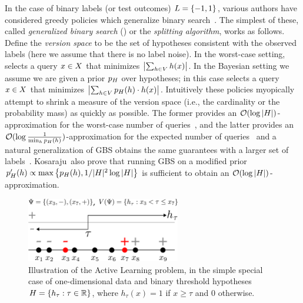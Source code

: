 In the case of binary labels (or test outcomes) $L = \left\{-1, 1\right\}$, various authors have considered greedy
policies which generalize binary
search~\citep{garey74,loveland85,arkin93,kosaraju99,dasgupta04,guillory09,nowak09}.  
The simplest of these, called \emph{generalized binary search} (\gbs) or the
\emph{splitting algorithm}, works as follows.
Define the \emph{version
  space} \vs to be the set of hypotheses consistent with the observed
labels (here we assume that there is no label noise).
In the worst-case setting, \gbs selects a query $x \in
X$ that minimizes $\left| \sum_{h \in V} h(x) \right|$. 
In the Bayesian setting we assume we are given a prior $p_{H}$ over
hypotheses; in this case \gbs selects a query $x \in
X$ that minimizes $\left| \sum_{h \in V} p_{H}(h) \cdot h(x) \right|$.  Intuitively
these policies myopically attempt to shrink a measure of the version space (i.e., 
the cardinality or the probability mass) as quickly as
possible.
The former provides an ${\mathcal{O}}(\log |H|)$-approximation for the
worst-case number of queries~\citep{arkin93}, and the latter provides an 
 ${\mathcal{O}}(\log \frac{1}{\min_{h} p_{H}(h)})$-approximation for the 
expected number of queries~\citep{kosaraju99,dasgupta04} and a natural
generalization of GBS obtains the same guarantees with a larger set of
labels~\citep{guillory09}. 
%
Kosaraju~\etal also prove that running GBS on a modified prior 
$p_{H}'(h) \propto \max\left\{p_{H}(h), 1/|H|^{2}\log
  |H|\right\}$ is sufficient to obtain an  ${\mathcal{O}}(\log |H|)$-approximation.


 \begin{figure} 
 \centering 
 \includegraphics[width=0.6\textwidth]{figs/activeLearning}
 \caption{Illustration of the Active Learning problem, in the simple
   special case of one-dimensional data and 
binary threshold hypotheses $H = \left\{h_\tau : \tau \in
  \mathbb{R}\right\}$, where $h_\tau(x) = 1$ if $x \ge \tau$ and $0$ otherwise.
 \label{fig:activelearning}}
 \end{figure}


